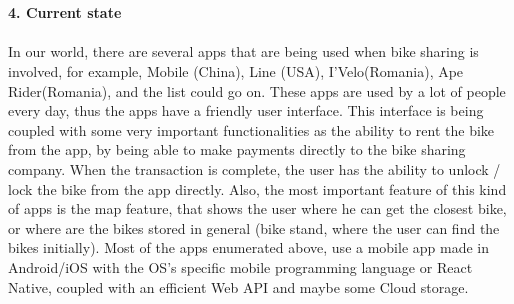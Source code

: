 \documentclass[a4paper]{article}
\begin{document}
\ \\ \ \\ 
\textbf{4. Current state}
\ \\ \ \\
In our world, there are several apps that are being used when bike sharing is involved, for example, Mobile (China), Line (USA), I'Velo(Romania), Ape Rider(Romania), and the list could go on. These apps are used by a lot of people every day, thus the apps have a friendly user interface.
This interface is being coupled with some very important functionalities as the ability to rent the bike from the app, by being able to make payments directly to the bike sharing company. When the transaction is complete, the user has the ability to unlock / lock the bike from the app directly. Also, the most important feature of this kind of apps is the map feature, that shows the user where he can get the closest bike, or where are the bikes stored in general (bike stand, where the user can find the bikes initially). Most of the apps enumerated above, use a mobile app made in Android/iOS with the OS's specific mobile programming language or React Native, coupled with an efficient Web API and maybe some Cloud storage.
\ \\ \ \\
\end{document}
